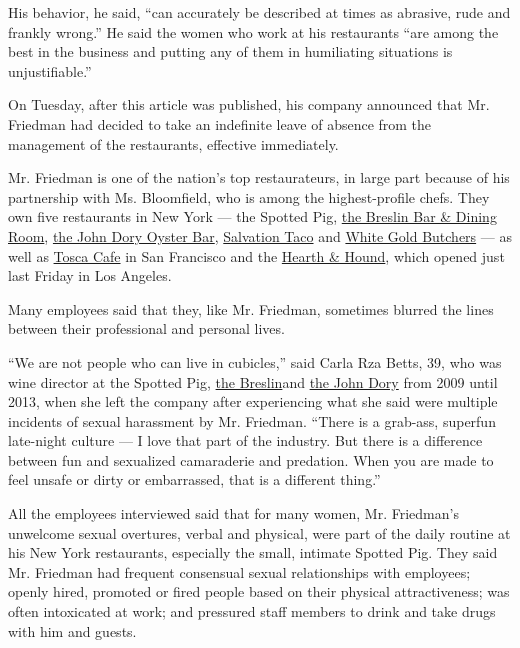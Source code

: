 His behavior, he said, ``can accurately be described at times as
abrasive, rude and frankly wrong.'' He said the women who work at his
restaurants ``are among the best in the business and putting any of them
in humiliating situations is unjustifiable.''

On Tuesday, after this article was published, his company announced that
Mr. Friedman had decided to take an indefinite leave of absence from the
management of the restaurants, effective immediately.

Mr. Friedman is one of the nation's top restaurateurs, in large part
because of his partnership with Ms. Bloomfield, who is among the
highest-profile chefs. They own five restaurants in New York --- the
Spotted Pig, \href{https://www.thebreslin.com/}{the Breslin Bar \&
Dining Room}, \href{https://www.thejohndory.com/}{the John Dory Oyster
Bar}, \href{https://www.salvationtaco.com/}{Salvation Taco} and
\href{https://www.nytimes3xbfgragh.onion/2017/02/07/dining/white-gold-butchers-review-april-bloomfield-restaurant.html?_r=0}{White
Gold Butchers} --- as well as \href{http://toscacafesf.com/}{Tosca Cafe}
in San Francisco and the
\href{https://www.thehearthandhound.com/}{Hearth \& Hound}, which opened
just last Friday in Los Angeles.

Many employees said that they, like Mr. Friedman, sometimes blurred the
lines between their professional and personal lives.

``We are not people who can live in cubicles,'' said Carla Rza Betts,
39, who was wine director at the Spotted Pig,
\href{https://www.thebreslin.com/}{the Breslin}and
\href{https://www.thejohndory.com/}{the John Dory} from 2009 until 2013,
when she left the company after experiencing what she said were multiple
incidents of sexual harassment by Mr. Friedman. ``There is a grab-ass,
superfun late-night culture --- I love that part of the industry. But
there is a difference between fun and sexualized camaraderie and
predation. When you are made to feel unsafe or dirty or embarrassed,
that is a different thing.''

All the employees interviewed said that for many women, Mr. Friedman's
unwelcome sexual overtures, verbal and physical, were part of the daily
routine at his New York restaurants, especially the small, intimate
Spotted Pig. They said Mr. Friedman had frequent consensual sexual
relationships with employees; openly hired, promoted or fired people
based on their physical attractiveness; was often intoxicated at work;
and pressured staff members to drink and take drugs with him and guests.

